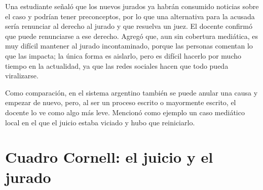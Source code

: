 \documentclass[12pt,oneside]{book}
\begin{document}
Una estudiante señaló que los nuevos jurados ya habrán consumido noticias sobre el caso y podrían tener preconceptos, por lo que una alternativa para la acusada sería renunciar al derecho al jurado y que resuelva un juez. El docente confirmó que puede renunciarse a ese derecho. Agregó que, aun sin cobertura mediática, es muy difícil mantener al jurado incontaminado, porque las personas comentan lo que las impacta; la única forma es aislarlo, pero es difícil hacerlo por mucho tiempo en la actualidad, ya que las redes sociales hacen que todo pueda viralizarse.

Como comparación, en el sistema argentino también se puede anular una causa y empezar de nuevo, pero, al ser un proceso escrito o mayormente escrito, el docente lo ve como algo más leve. Mencionó como ejemplo un caso mediático local en el que el juicio estaba viciado y hubo que reiniciarlo. %

\section{Cuadro Cornell: el juicio y el jurado}
\end{document}

